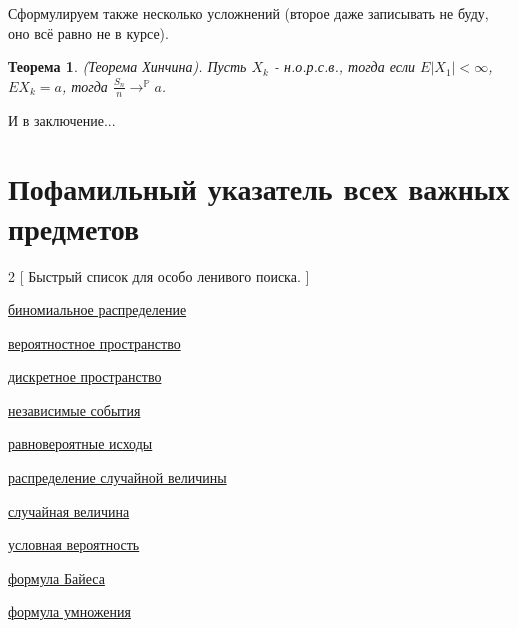 \documentclass[a4paper,100pt]{article}
\theoremstyle{indented}
\newtheorem{theorem}{Теорема}
\theoremstyle{definition}
\theoremstyle{remark}
\DeclareMathOperator{\PP}{\mathbb{P}}
\begin{document}
Сформулируем также несколько усложнений (второе даже записывать не буду, оно всё равно не в курсе). \\

\begin{theorem}
    (Теорема Хинчина). Пусть $X_k$ - н.о.р.с.в., тогда если $E|X_1|<\infty$, $EX_k=a$, тогда $\frac{S_n}{n}\rightarrow^{\PP}a$. 
\end{theorem}


\newpage

\hypertarget{t2}{И в заключение...}

\section{Пофамильный указатель всех важных предметов}

\begin{multicols}{2}
    [
    Быстрый список для особо ленивого поиска.
    ]

    \hyperlink{n1}{биномиальное распределение}\
    
    \hyperlink{n1}{вероятностное пространство}\
    
    \hyperlink{n2}{дискретное пространство}\

    \hyperlink{n7}{независимые события}\

    \hyperlink{n3}{равновероятные исходы}\

    \hyperlink{n1}{распределение случайной величины}\

    \hyperlink{n8}{случайная величина}\

    \hyperlink{n4}{условная вероятность}\

    \hyperlink{n5}{формула Байеса}\

    \hyperlink{n6}{формула умножения}\



\end{multicols}
\end{document}
